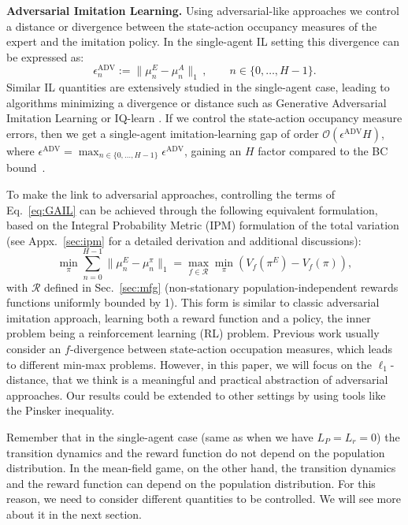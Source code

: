 \documentclass{article}
\begin{document}
\textbf{Adversarial Imitation Learning.}\label{subsubsec:gail-like}
%
Using adversarial-like approaches \cite{ho2016generative,garg2021iq} we control a distance or divergence between the state-action occupancy measures of the expert and the imitation policy. In the single-agent IL setting this divergence can be expressed as: 
\begin{equation}
\label{eq:GAIL}
\epsilon^{\mathrm{ADV}}_n := \|\mu^E_n - \mu^A_n\|_1\,, \qquad  n \in \{0, \dots, H-1\}.
\end{equation}
Similar IL quantities are extensively studied in the single-agent case, leading to algorithms minimizing a divergence or distance such as Generative Adversarial Imitation Learning \cite{ho2016generative} or IQ-learn \cite{garg2021iq}. If we control the state-action occupancy measure errors, then we get a single-agent imitation-learning gap of order $\mathcal{O}\left(\epsilon^{\mathrm{ADV}}H\right)$, where $\epsilon^{\mathrm{ADV}} = \max_{n\in \{0,\dots,H-1\}}\epsilon^{\mathrm{ADV}}$, gaining an $H$ factor compared to the BC bound~\cite{xu2020error}. 

To make the link to adversarial approaches, controlling the terms of Eq.~\eqref{eq:GAIL} can be achieved through the following equivalent formulation, based on the Integral Probability Metric (IPM) formulation of the total variation (see Appx.~\ref{sec:ipm} for a detailed derivation and additional discussions):
\begin{equation}
    \label{eq:IPM-classic}
    \min_\pi \sum_{n=0}^{H-1}\|\mu_n^E - \mu_n^\pi\|_1 
    = \max_{f\in\mathcal{R}} \min_\pi (V_f(\pi^E) - V_f(\pi)),
\end{equation}
with $\mathcal{R}$ defined in Sec.~\ref{sec:mfg} (non-stationary population-independent rewards functions uniformly bounded by 1). This form is similar to classic adversarial imitation approach, learning both a reward function and a policy, the inner problem being a reinforcement learning (RL) problem.
Previous work usually consider an $f$-divergence \cite{ghasemipour2020divergence,ke2021imitation} between state-action occupation measures, which leads to different min-max problems. However, in this paper, we will focus on the $\ell_1$-distance, that we think is a meaningful and practical abstraction of adversarial approaches. Our results could be extended to other settings by using tools like the Pinsker inequality.

\begin{remark}
Remember that in the single-agent case (same as when we have $L_P=L_r=0$) the transition dynamics and the reward function do not depend on the population distribution. In the mean-field game, on the other hand, the transition dynamics and the reward function can depend on the population distribution. For this reason, we need to consider different quantities to be controlled. We will see more about it in the next section.
\end{remark}
\end{document}
